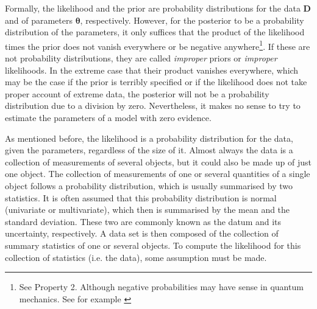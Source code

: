 Formally, the likelihood and the prior are probability distributions for the data $\mathbf{D}$ and of parameters $\boldsymbol{\theta}$, respectively. However, for the posterior to be a probability distribution of the parameters, it only suffices that the product of the likelihood times the prior does not vanish everywhere or be negative anywhere\footnote{See Property 2. Although negative probabilities may have sense in quantum mechanics. See for example \citet{1942RSPSA.180....1D}}. If these are not probability distributions, they are called \emph{improper} priors or \emph{improper} likelihoods. In the extreme case that their product vanishes everywhere, which may be the case if the prior is terribly specified or if the likelihood does not take proper account of extreme data, the posterior will not be a probability distribution due to a division by zero. Nevertheless, it makes no sense to try to estimate the parameters of a model with zero evidence.

%

As mentioned before, the likelihood is a probability distribution for the data, given the parameters, regardless of the size of it. Almost always the data is a collection of measurements of several objects, but it could also be made up of just one object. The collection of measurements of one or several quantities of a single object follows a probability distribution, which is usually summarised by two statistics. It is often assumed that this probability distribution is normal (univariate or multivariate), which then is summarised by the mean and the standard deviation. These two are commonly known as the datum and its uncertainty, respectively. A data set is then composed of the collection of summary statistics of one or several objects. To compute the likelihood for this collection of statistics (i.e. the data), some assumption must be made. 

